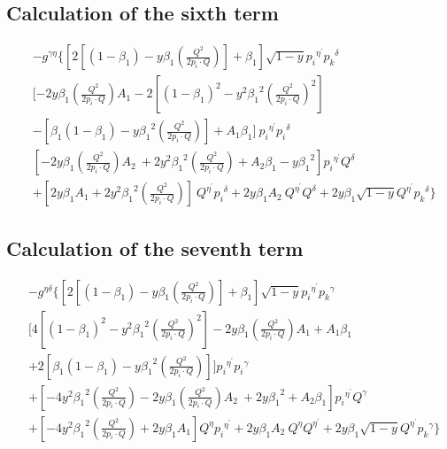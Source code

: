 \subsection*{Calculation of the sixth term}
\begin{equation}
\begin{split}
&-g^{{{\gamma}}{{\eta}}}\lbrace[2[(1-\beta_1)-y\beta_1 (\frac{Q^2}{2p_i \cdot Q})]+\beta_1 ] \sqrt{1-y}{p_i}^{{\eta}^{\prime}}{{p_k}^{{\delta}}}\\
&[-2y {\beta_1} (\frac{Q^2}{2p_i \cdot Q}) A_1-2[(1-\beta_1)^2-y^2 {\beta_1}^2 (\frac{Q^2}{2p_i \cdot Q})^2]\\
&-[\beta_1(1-\beta_1)-y {\beta_1}^2 (\frac{Q^2}{2p_i \cdot Q})] +A_1\beta_1 ] \:{p_i}^{{\eta}^{\prime}}{p_i}^{{\delta}}\\
&[-2y {\beta_1} (\frac{Q^2}{2p_i \cdot Q}) A_2\:+2y^2 {\beta_1}^2 (\frac{Q^2}{2p_i \cdot Q})+A_2\beta_1 -y {\beta_1}^2 ] {p_i}^{{\eta}^{\prime}}{Q}^{{\delta}}\\
&+[2y {\beta_1} A_1+2y^2 {\beta_1}^2 (\frac{Q^2}{2p_i \cdot Q})] \:{Q}^{{\eta}^{\prime}}{p_i}^{{\delta}}+2y {\beta_1} A_2 \:{Q}^{{\eta}^{\prime}}{Q}^{{\delta}}+2y {\beta_1}\sqrt{1-y}{Q}^{{\eta}^{\prime}}{{p_k}^{{\delta}}}
\rbrace
\end{split}
\end{equation}

\subsection*{Calculation of the seventh term}

\begin{equation}
\begin{split} 
&-g^{{{\eta}}{{\delta}}}\lbrace [2[(1-\beta_1)-y\beta_1 (\frac{Q^2}{2p_i \cdot Q})]+\beta_1 ] \sqrt{1-y}{p_i}^{{\eta}^{\prime}}{{p_k}^{{\gamma}}}\\
&[4[(1-\beta_1)^2-y^2 {\beta_1}^2 (\frac{Q^2}{2p_i \cdot Q})^2]-2y {\beta_1} (\frac{Q^2}{2p_i \cdot Q}) A_1 +A_1\beta_1 \\
&+2[\beta_1(1-\beta_1)-y {\beta_1}^2 (\frac{Q^2}{2p_i \cdot Q})]] {p_i}^{{\eta}^{\prime}}{p_i}^{{\gamma}}\\
&+[-4y^2 {\beta_1}^2 (\frac{Q^2}{2p_i \cdot Q})-2y {\beta_1} (\frac{Q^2}{2p_i \cdot Q}) A_2\: +2y {\beta_1}^2 +A_2\beta_1 ]{p_i}^{{\eta}^{\prime}}{Q}^{{\gamma}}\\
&+[-4y^2 {\beta_1}^2 (\frac{Q^2}{2p_i \cdot Q})+2y {\beta_1} A_1]{Q}^{{\eta}}{p_i}^{{\eta}^{\prime}}+2y {\beta_1} A_2 \:{Q}^{{\eta}}{Q}^{{\eta}^{\prime}}+2y {\beta_1}\sqrt{1-y}{Q}^{{\eta}^{\prime}}{{p_k}^{{\gamma}}}\rbrace\\
\end{split}
\end{equation}

